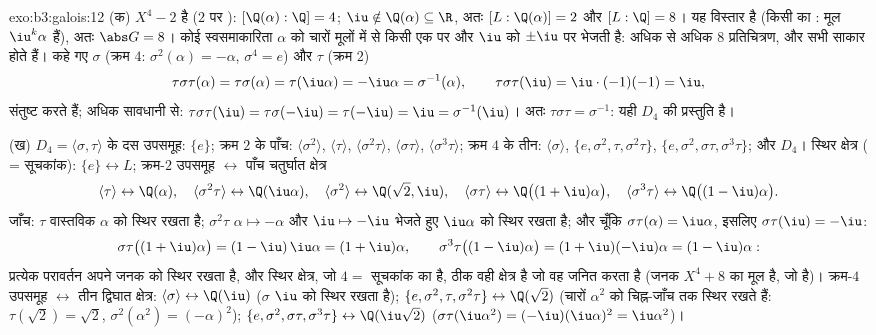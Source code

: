 \begin{solution}{exo:b3:galois:12}
(क) $X^4 - 2$  है ($2$ पर ): $[\Q(\alpha):\Q] = 4$; $\iu \notin \Q(\alpha) \subseteq \R$, अतः
$[L : \Q(\alpha)] = 2$ और $[L:\Q] = 8$। यह विस्तार  है (किसी  का : मूल $\iu^k\alpha$ हैं), अतः $\abs G = 8$। कोई स्वसमाकारिता $\alpha$ को चारों
मूलों में से किसी एक पर और $\iu$ को $\pm\iu$ पर भेजती है: अधिक से अधिक
$8$ प्रतिचित्रण, और सभी साकार होते हैं। कहे गए $\sigma$ (क्रम $4$:
$\sigma^2(\alpha) = -\alpha$, $\sigma^4 = e$) और $\tau$ (क्रम $2$)
\[
\tau\sigma\tau(\alpha) = \tau\sigma(\alpha) =
\tau(\iu\alpha) = -\iu\alpha = \sigma^{-1}(\alpha),
\qquad \tau\sigma\tau(\iu) = \iu\cdot(-1)(-1) = \iu ,
\]
संतुष्ट करते हैं; अधिक सावधानी से: $\tau\sigma\tau(\iu) = \tau\sigma(-\iu) =
\tau(-\iu) = \iu = \sigma^{-1}(\iu)$। अतः $\tau\sigma\tau =
\sigma^{-1}$: यही $D_4$ की
प्रस्तुति है।

(ख) $D_4 = \langle\sigma,
\tau\rangle$ के दस उपसमूह: $\{e\}$; क्रम $2$ के पाँच: $\langle\sigma^2\rangle$, $\langle\tau\rangle$,
$\langle\sigma^2\tau\rangle$, $\langle\sigma\tau\rangle$, $\langle\sigma^3\tau\rangle$; क्रम $4$ के तीन: $\langle\sigma\rangle$, $\{e, \sigma^2, \tau,
\sigma^2\tau\}$, $\{e, \sigma^2, \sigma\tau,
\sigma^3\tau\}$; और
$D_4$। स्थिर क्षेत्र ( = सूचकांक): $\{e\} \leftrightarrow L$; क्रम-$2$ उपसमूह
$\leftrightarrow$ पाँच चतुर्घात क्षेत्र
\[
\langle\tau\rangle \leftrightarrow \Q(\alpha),\quad
\langle\sigma^2\tau\rangle \leftrightarrow \Q(\iu\alpha),
\quad
\langle\sigma^2\rangle \leftrightarrow \Q(\sqrt2, \iu),\quad
\langle\sigma\tau\rangle \leftrightarrow
\Q\bigl((1+\iu)\alpha\bigr),\quad
\langle\sigma^3\tau\rangle \leftrightarrow
\Q\bigl((1-\iu)\alpha\bigr) .
\]
जाँच: $\tau$ वास्तविक $\alpha$ को स्थिर रखता है; $\sigma^2\tau$ $\alpha \mapsto -\alpha$ और $\iu \mapsto -\iu$
भेजते हुए $\iu\alpha$ को स्थिर रखता है; और चूँकि $\sigma\tau(\alpha) = \iu\alpha$, इसलिए $\sigma\tau(\iu) = -\iu$:
\[
\sigma\tau\bigl((1+\iu)\alpha\bigr) =
(1 - \iu)\,\iu\alpha = (1 + \iu)\alpha,
\qquad
\sigma^3\tau\bigl((1-\iu)\alpha\bigr) =
(1 + \iu)(-\iu)\alpha = (1 - \iu)\alpha :
\]
प्रत्येक परावर्तन अपने जनक को स्थिर रखता है, और स्थिर क्षेत्र, जो
 $4 ={}$ सूचकांक का है, ठीक वही क्षेत्र है जो वह जनित करता है (जनक
$X^4 + 8$ का मूल है, जो  है)। क्रम-$4$ उपसमूह $\leftrightarrow$ तीन द्विघात
क्षेत्र: $\langle\sigma\rangle \leftrightarrow \Q(\iu)$ ($\sigma$ $\iu$ को स्थिर रखता है); $\{e, \sigma^2, \tau, \sigma^2\tau\}
\leftrightarrow \Q(\sqrt2)$ (चारों $\alpha^2$
को चिह्न-जाँच तक स्थिर रखते हैं: $\tau(\sqrt2) = \sqrt2$, $\sigma^2(\alpha^2) =
(-\alpha)^2$); $\{e, \sigma^2, \sigma\tau, \sigma^3\tau\}
\leftrightarrow \Q(\iu\sqrt2)$ ($\sigma\tau(\iu\alpha^2) =
(-\iu)(\iu\alpha)^2 = \iu\alpha^2$)।


\end{solution}
